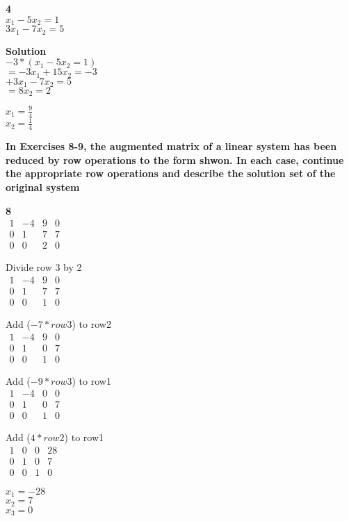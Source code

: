 \documentclass{article}
\begin{document}
\bf{4}\\
$x_{1} - 5x_{2} = 1$\\
$3x_{1} - 7x_{2} = 5$

\bf{Solution}\\
$-3*(x_{1} - 5x_{2} = 1)$\\
$=-3x_{1}+15x_{2} = -3$\\
$+ 3x_{1} - 7x_{2} = 5$\\
$= 8x_{2} = 2$

$x_{1} = \frac{9}{4}$\\
$x_{2} = \frac{1}{4}$

\bf{In Exercises 8-9, the augmented matrix of a linear system has been reduced by row operations to the form shwon. In each case, continue the appropriate row operations and describe the solution set of the original system}

\bf{8}\\
$
\begin{matrix}
1 & -4 & 9 & 0\\
0 & 1 & 7 &  7\\
0 & 0 & 2 &  0
\end{matrix}
$

Divide row 3 by 2\\
$
\begin{matrix}
1 & -4 & 9 & 0\\
0 & 1 & 7 &  7\\
0 & 0 & 1 &  0
\end{matrix}
$

Add ($-7*row3$) to row2\\
$
\begin{matrix}
1 & -4 & 9 & 0\\
0 & 1 & 0 &  7\\
0 & 0 & 1 &  0
\end{matrix}
$

Add ($-9*row3$) to row1\\
$
\begin{matrix}
1 & -4 & 0 & 0\\
0 & 1 & 0 &  7\\
0 & 0 & 1 &  0
\end{matrix}
$

Add ($4*row2$) to row1\\
$
\begin{matrix}
1 & 0 & 0 & 28\\
0 & 1 & 0 &  7\\
0 & 0 & 1 &  0
\end{matrix}
$

$x_{1} = -28$\\
$x_{2} = 7$\\
$x_{3} = 0$
\end{document}
